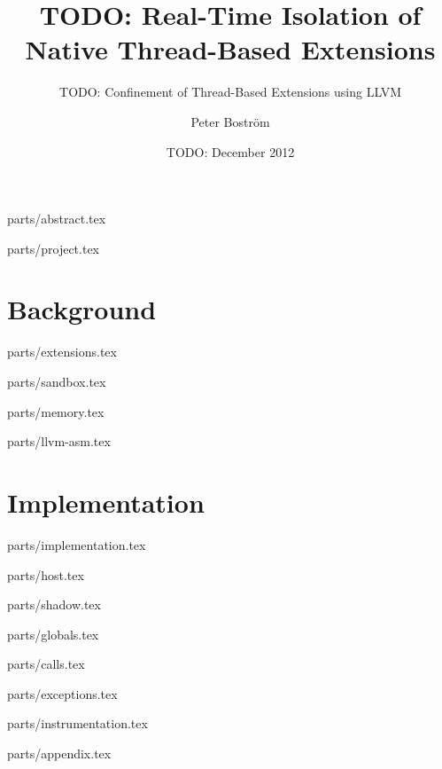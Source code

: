 \documentclass[a4paper,11pt]{xjobb/kth-mag}
\title {TODO: Real-Time Isolation of Native Thread-Based Extensions}
\subtitle {TODO: Confinement of Thread-Based Extensions using LLVM}
\author {Peter Boström}
\date {TODO: December 2012}
\begin{document}
\frontmatter
\pagestyle {empty}
\removepagenumbers
\maketitle
{}

 {parts/abstract.tex}

\clearpage
\tableofcontents*
\mainmatter
\pagestyle {newchap}

 {parts/project.tex}


\part {Background}

 {parts/extensions.tex}

 {parts/sandbox.tex}

 {parts/memory.tex}

 {parts/llvm-asm.tex}


\part {Implementation}

 {parts/implementation.tex}

 {parts/host.tex}

 {parts/shadow.tex}

 {parts/globals.tex}

 {parts/calls.tex}

 {parts/exceptions.tex}

 {parts/instrumentation.tex}


\appendix
\addappheadtotoc

 {parts/appendix.tex}
\end{document}
